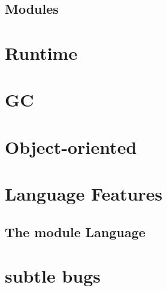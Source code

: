\documentclass[svgnames,12pt,a4paper]{book}
\begin{document}
  
  
  
  
  
  
  

  
  
  
  
  
  
  
  
  

  
  
\section{Modules}


\chapter{Runtime}
\label{sec:runtime}



\chapter{GC}
\label{sec:gc}



\chapter{Object-oriented}



\chapter{Language Features}
\label{sec:compl-lang-feat}








\section{The module Language}
\label{sec:module-language}

\chapter{subtle bugs}
\label{sec:subtle-bugs}




\end{document}
